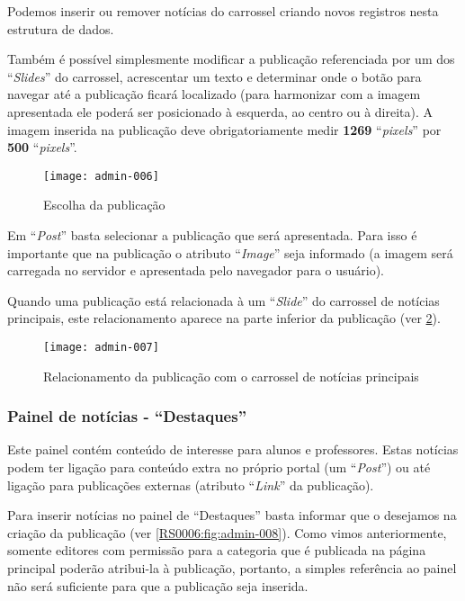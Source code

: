 Podemos inserir ou remover notícias do carrossel criando novos registros nesta estrutura de dados.

Também é possível simplesmente modificar a publicação referenciada por um dos ``\textit{Slides}'' do carrossel, acrescentar um texto e determinar onde o botão para navegar até a publicação ficará localizado (para harmonizar com a imagem apresentada ele poderá ser posicionado à esquerda, ao centro ou à direita). A imagem inserida na publicação deve obrigatoriamente medir \textbf{1269} ``\textit{pixels}'' por \textbf{500} ``\textit{pixels}''.

\begin{figure}[!ht]
    \centering
    \texttt{[image: admin-006]}
    \caption{Escolha da publicação}\label{RS0006:fig:admin-006}
\end{figure}

Em ``\textit{Post}'' basta selecionar a publicação que será apresentada. Para isso é importante que na publicação o atributo ``\textit{Image}'' seja informado (a imagem será carregada no servidor e apresentada pelo navegador para o usuário).

\begin{displayquote}
    Quando uma publicação está relacionada à um ``\textit{Slide}'' do carrossel de notícias principais, este relacionamento aparece na parte inferior da publicação (ver \cref{RS0006:fig:admin-007}).
\end{displayquote}

\begin{figure}[!ht]
    \centering
    \texttt{[image: admin-007]}
    \caption{Relacionamento da publicação com o carrossel de notícias principais}\label{RS0006:fig:admin-007}
\end{figure}

\subsubsection{Painel de notícias - ``Destaques''}

Este painel contém conteúdo de interesse para alunos e professores. Estas notícias podem ter ligação para conteúdo extra no próprio portal (um ``\textit{Post}'') ou até ligação para publicações externas (atributo ``\textit{Link}'' da publicação).

Para inserir notícias no painel de ``Destaques'' basta informar que o desejamos na criação da publicação (ver \cref{RS0006:fig:admin-008}). Como vimos anteriormente, somente editores com permissão para a categoria que é publicada na página principal poderão atribui-la à publicação, portanto, a simples referência ao painel não será suficiente para que a publicação seja inserida.

